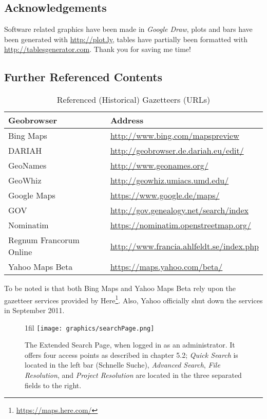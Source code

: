 \documentclass[11pt]{article}
\makeatletter
\newcommand*{\centerfloat}{
  \parindent \z@
  \leftskip \z@ \@plus 1fil \@minus \textwidth
  \rightskip\leftskip
  \parfillskip \z@skip}
\makeatother
\begin{document}
\newpage
\subsection{Acknowledgements}
Software related graphics have been made in \emph{Google Draw}, plots and bars have been generated with \url{http://plot.ly}, tables have partially been formatted with \url{http://tablesgenerator.com}. Thank you for saving me time!

\subsection{Further Referenced Contents}

\begin{table*}[h!]
  \centering
  \begin{tabular}{l|l}
  Geobrowser & Address \\
  \hline
  Bing Maps & \url{http://www.bing.com/mapspreview} \\
  DARIAH & \url{http://geobrowser.de.dariah.eu/edit/} \\
  GeoNames & \url{http://www.geonames.org/} \\
  GeoWhiz & \url{http://geowhiz.umiacs.umd.edu/} \\
  Google Maps & \url{https://www.google.de/maps/} \\
  GOV & \url{http://gov.genealogy.net/search/index} \\
  Nominatim & \url{https://nominatim.openstreetmap.org/} \\
  Regnum Francorum Online & \url{http://www.francia.ahlfeldt.se/index.php} \\
  Yahoo Maps Beta & \url{https://maps.yahoo.com/beta/} \\
  \end{tabular}
  \caption{Referenced (Historical) Gazetteers (URLs)}
  \label{tab:gazetteers}
\end{table*} 

To be noted is that both Bing Maps and Yahoo Maps Beta rely upon the gazetteer services provided by Here\footnote{\url{https://maps.here.com/}}. Also, Yahoo officially shut down the services in September 2011.

\newpage

\begin{figure}[h!]
  \centerfloat
    \texttt{[image: graphics/searchPage.png]}
  \caption{The Extended Search Page, when logged in as an administrator. It offers four access points as described in chapter 5.2; \emph{Quick Search} is located in the left bar (Schnelle Suche), \emph{Advanced Search}, \emph{File Resolution}, and \emph{Project Resolution} are located in the three separated fields to the right.}
  \label{fig:searchPage}
\end{figure} \newpage
\end{document}
